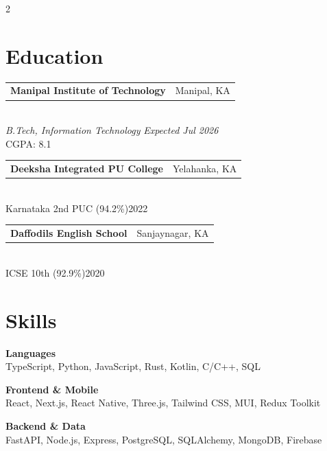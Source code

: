 \documentclass[letterpaper,10pt]{article}
\makeatletter
\newcommand{\entry}[2]{%
  \vspace{1pt}
  \begin{tabular*}{\linewidth}{@{}l@{\extracolsep{\fill}}r@{}}
    \small\textbf{#1} & \footnotesize #2
  \end{tabular*}\vspace{-4pt}
}
\makeatother
\begin{document}
\setlength{\columnseprule}{0.2pt}
\begin{paracol}{2}

\section{Education}

\entry{Manipal Institute of Technology}{Manipal, KA}\\[6pt]
{\small\textit{B.Tech, Information Technology} \hfill \textit{Expected Jul 2026}}\\[2pt]
{\small CGPA: 8.1}

\vspace{8pt}

\entry{Deeksha Integrated PU College}{Yelahanka, KA}\\[4pt]
{\small Karnataka 2nd PUC (94.2\%)\hfill 2022}

\vspace{6pt}

\entry{Daffodils English School}{Sanjaynagar, KA}\\[4pt]
{\small ICSE 10th (92.9\%)\hfill 2020}\\[-2pt]
\section{Skills}

{\small\textbf{Languages}}\\[2pt]
{\small TypeScript, Python, JavaScript, Rust, Kotlin, C/C++, SQL}

\vspace{3pt}

{\small\textbf{Frontend \& Mobile}}\\[2pt]
{\small React, Next.js, React Native, Three.js, Tailwind CSS, MUI, Redux Toolkit}

\vspace{3pt}

{\small\textbf{Backend \& Data}}\\[2pt]
{\small FastAPI, Node.js, Express, PostgreSQL, SQLAlchemy, MongoDB, Firebase}

\vspace{3pt}


\end{paracol}
\end{document}
